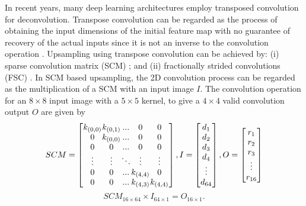 \documentclass[journal]{IEEEtran}
\begin{document}
In recent years, many deep learning architectures employ transposed convolution for deconvolution. Transpose convolution can be regarded as the process of obtaining the input dimensions of the initial feature map  with no guarantee of recovery of the actual inputs since it is not an inverse to the convolution operation \cite{article3}. Upsampling using transpose convolution can be achieved by: (i) sparse convolution matrix (SCM) \cite{article22}; and (ii) fractionally strided convolutions (FSC)  \cite{inproceedings2,article4,article3,inproceedings15,inproceedings19}. In SCM based upsampling, the 2D convolution process can be regarded as the multiplication of a SCM with an input image $I$. The convolution operation for an $8 \times 8$  input image with a $5 \times 5$ kernel, to give a $4 \times 4$ valid convolution output $O$ are given by
\begin{equation}       
SCM=\left[          
  \setlength{\arraycolsep}{0.1mm}{ 
  \begin{array}{ccccc} 
    k_{(0,0)} & k_{(0,1)}   & ... & 0 & 0\\  
     0  & k_{(0,0)}   & ... & 0 & 0\\
     0  & 0     & ... & 0 & 0\\ 
     \vdots    & \vdots & \ddots & \vdots & \vdots\\
    0  & 0     & ... & k_{(4,4)} & 0\\
    0  & 0     & ... & k_{(4,3)} & k_{(4,4)}\\ 
  \end{array}}
\right]
,
I=\left[           
  \setlength{\arraycolsep}{0.1mm}{
  \begin{array}{c}   
    d_1 \\ d_2 \\ d_3 \\ d_4 \\ \vdots \\ d_{64}  \\  
  \end{array}}
\right],
O=\left[           
  \setlength{\arraycolsep}{0.1mm}{
  \begin{array}{c}   
    r_1 \\ r_2 \\ r_3 \\ \vdots\\ r_{16}  \\ 
  \end{array}}
\right]
\end{equation}
\begin{equation}
SCM_{16 \times 64} \times I_{64\times1}=O_{16\times1} .
\end{equation}
\end{document}
